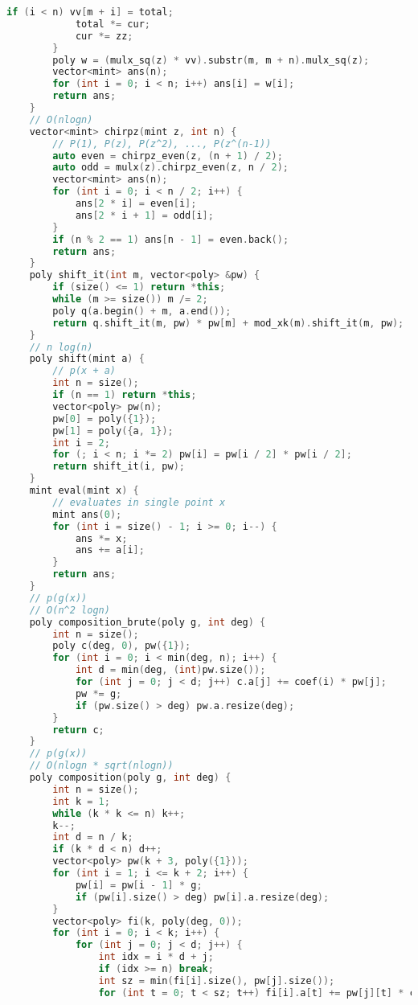 \documentclass[10pt, a4paper, oneside]{book}
\begin{document}
\begin{lstlisting}[language=C++]
            if (i < n) vv[m + i] = total;
            total *= cur;
            cur *= zz;
        }
        poly w = (mulx_sq(z) * vv).substr(m, m + n).mulx_sq(z);
        vector<mint> ans(n);
        for (int i = 0; i < n; i++) ans[i] = w[i];
        return ans;
    }
    // O(nlogn)
    vector<mint> chirpz(mint z, int n) {
        // P(1), P(z), P(z^2), ..., P(z^(n-1))
        auto even = chirpz_even(z, (n + 1) / 2);
        auto odd = mulx(z).chirpz_even(z, n / 2);
        vector<mint> ans(n);
        for (int i = 0; i < n / 2; i++) {
            ans[2 * i] = even[i];
            ans[2 * i + 1] = odd[i];
        }
        if (n % 2 == 1) ans[n - 1] = even.back();
        return ans;
    }
    poly shift_it(int m, vector<poly> &pw) {
        if (size() <= 1) return *this;
        while (m >= size()) m /= 2;
        poly q(a.begin() + m, a.end());
        return q.shift_it(m, pw) * pw[m] + mod_xk(m).shift_it(m, pw);
    }
    // n log(n)
    poly shift(mint a) {
        // p(x + a)
        int n = size();
        if (n == 1) return *this;
        vector<poly> pw(n);
        pw[0] = poly({1});
        pw[1] = poly({a, 1});
        int i = 2;
        for (; i < n; i *= 2) pw[i] = pw[i / 2] * pw[i / 2];
        return shift_it(i, pw);
    }
    mint eval(mint x) {
        // evaluates in single point x
        mint ans(0);
        for (int i = size() - 1; i >= 0; i--) {
            ans *= x;
            ans += a[i];
        }
        return ans;
    }
    // p(g(x))
    // O(n^2 logn)
    poly composition_brute(poly g, int deg) {
        int n = size();
        poly c(deg, 0), pw({1});
        for (int i = 0; i < min(deg, n); i++) {
            int d = min(deg, (int)pw.size());
            for (int j = 0; j < d; j++) c.a[j] += coef(i) * pw[j];
            pw *= g;
            if (pw.size() > deg) pw.a.resize(deg);
        }
        return c;
    }
    // p(g(x))
    // O(nlogn * sqrt(nlogn))
    poly composition(poly g, int deg) {
        int n = size();
        int k = 1;
        while (k * k <= n) k++;
        k--;
        int d = n / k;
        if (k * d < n) d++;
        vector<poly> pw(k + 3, poly({1}));
        for (int i = 1; i <= k + 2; i++) {
            pw[i] = pw[i - 1] * g;
            if (pw[i].size() > deg) pw[i].a.resize(deg);
        }
        vector<poly> fi(k, poly(deg, 0));
        for (int i = 0; i < k; i++) {
            for (int j = 0; j < d; j++) {
                int idx = i * d + j;
                if (idx >= n) break;
                int sz = min(fi[i].size(), pw[j].size());
                for (int t = 0; t < sz; t++) fi[i].a[t] += pw[j][t] * coef(idx);

\end{lstlisting}
\end{document}
